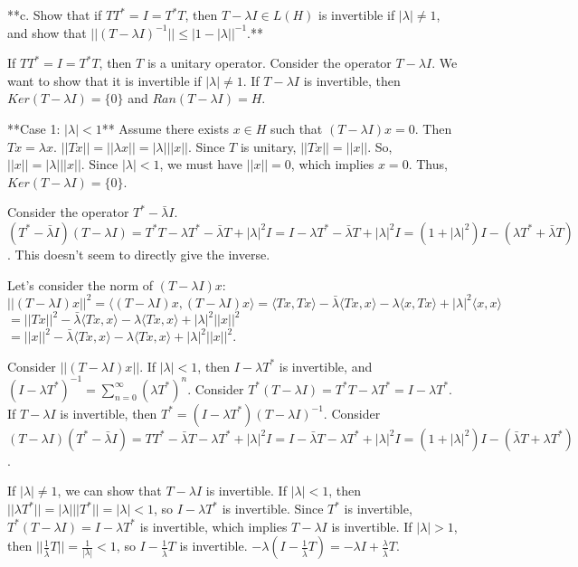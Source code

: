 **c. Show that if $T T^* = I = T^* T$, then $T - \lambda I \in L(H)$ is invertible if $|\lambda| \neq 1$, and show that $||(T - \lambda I) ^{-1}|| \le |1 - |\lambda||^{-1}$.**

If $T T^* = I = T^* T$, then $T$ is a unitary operator.
Consider the operator $T - \lambda I$. We want to show that it is invertible if $|\lambda| \neq 1$.
If $T - \lambda I$ is invertible, then $Ker(T - \lambda I) = \{0\}$ and $Ran(T - \lambda I) = H$.

**Case 1: $|\lambda| < 1$**
Assume there exists $x \in H$ such that $(T - \lambda I) x = 0$.
Then $Tx = \lambda x$.
$||Tx|| = ||\lambda x|| = |\lambda| ||x||$.
Since $T$ is unitary, $||Tx|| = ||x||$.
So, $||x|| = |\lambda| ||x||$.
Since $|\lambda| < 1$, we must have $||x|| = 0$, which implies $x = 0$.
Thus, $Ker(T - \lambda I) = \{0\}$.

Consider the operator $T^* - \bar{\lambda} I$.
$(T^* - \bar{\lambda} I)(T - \lambda I) = T^* T - \lambda T^* - \bar{\lambda} T + |\lambda|^2 I = I - \lambda T^* - \bar{\lambda} T + |\lambda|^2 I = (1 + |\lambda|^2) I - (\lambda T^* + \bar{\lambda} T)$.
This doesn't seem to directly give the inverse.

Let's consider the norm of $(T - \lambda I)x$:
$||(T - \lambda I)x||^2 = \langle (T - \lambda I)x, (T - \lambda I)x \rangle = \langle Tx, Tx \rangle - \bar{\lambda} \langle Tx, x \rangle - \lambda \langle x, Tx \rangle + |\lambda|^2 \langle x, x \rangle$
$= ||Tx||^2 - \bar{\lambda} \langle Tx, x \rangle - \lambda \langle Tx, x \rangle + |\lambda|^2 ||x||^2$
$= ||x||^2 - \bar{\lambda} \langle Tx, x \rangle - \lambda \langle Tx, x \rangle + |\lambda|^2 ||x||^2$.

Consider $||(T - \lambda I)x||$.
If $|\lambda| < 1$, then $I - \lambda T^*$ is invertible, and $(I - \lambda T^*)^{-1} = \sum_{n=0}^\infty (\lambda T^*)^n$.
Consider $T^* (T - \lambda I) = T^* T - \lambda T^* = I - \lambda T^*$.
If $T - \lambda I$ is invertible, then $T^* = (I - \lambda T^*) (T - \lambda I)^{-1}$.
Consider $(T - \lambda I) (T^* - \bar{\lambda} I) = T T^* - \bar{\lambda} T - \lambda T^* + |\lambda|^2 I = I - \bar{\lambda} T - \lambda T^* + |\lambda|^2 I = (1 + |\lambda|^2) I - (\bar{\lambda} T + \lambda T^*)$.

If $|\lambda| \neq 1$, we can show that $T - \lambda I$ is invertible.
If $|\lambda| < 1$, then $||\lambda T^*|| = |\lambda| ||T^*|| = |\lambda| < 1$, so $I - \lambda T^*$ is invertible.
Since $T^*$ is invertible, $T^* (T - \lambda I) = I - \lambda T^*$ is invertible, which implies $T - \lambda I$ is invertible.
If $|\lambda| > 1$, then $||\frac{1}{\bar{\lambda}} T|| = \frac{1}{|\lambda|} < 1$, so $I - \frac{1}{\bar{\lambda}} T$ is invertible.
$-\lambda (I - \frac{1}{\bar{\lambda}} T) = -\lambda I + \frac{\lambda}{\bar{\lambda}} T$.

